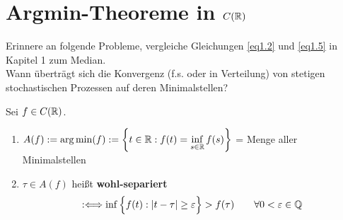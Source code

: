 
\section{Argmin-Theoreme in \texorpdfstring{$C(\mathbb{R})$}{C(R)}} %
Erinnere an folgende Probleme, vergleiche Gleichungen \eqref{eq1.2} und \eqref{eq1.5} in Kapitel 1 zum Median.\\
Wann überträgt sich die Konvergenz (f.s. oder in Verteilung) von stetigen stochastischen Prozessen auf deren Minimalstellen?

\begin{definition}\label{definition8.1}
	Sei $f\in C(\mathbb{R})$.
	\begin{enumerate}[label=(\arabic*)]
		\item $\begin{aligned}
			A(f):=\operatorname*{arg\,min}(f):=\left\lbrace t\in\mathbb{R}:f(t)=\inf\limits_{s\in\mathbb{R}} f(s)\right\rbrace
		\end{aligned}$ = Menge aller Minimalstellen
		\item $\tau\in A(f)$ heißt \textbf{wohl-separiert} 
		\begin{align*}
			:\Longleftrightarrow\inf\Big\lbrace f(t):|t-\tau|\geq\varepsilon\Big\rbrace>f(\tau)\qquad\forall 0<\varepsilon\in\mathbb{Q}
		\end{align*}
	\end{enumerate}
\end{definition}


